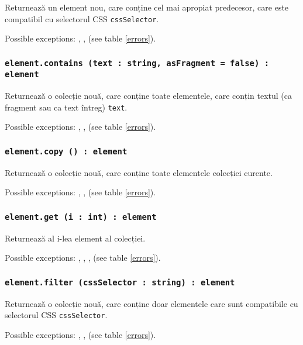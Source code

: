 Returnează un element nou, care conține cel mai apropiat predecesor, care este compatibil cu selectorul CSS \texttt{cssSelector}.

Possible exceptions: , ,  (see table \ref{errors}).

\subsubsection{\texttt{element.contains (text : string, asFragment = false) : element}}

Returnează o colecție nouă, care conține toate elementele, care conțin textul (ca fragment sau ca text întreg) \texttt{text}.

Possible exceptions: , ,  (see table \ref{errors}).

\subsubsection{\texttt{element.copy () : element}}

Returnează o colecție nouă, care conține toate elementele colecției curente.

Possible exceptions: , ,  (see table \ref{errors}).

\subsubsection{\texttt{element.get (i : int) : element}}

Returnează al i-lea element al colecției.

Possible exceptions: , , ,  (see table \ref{errors}).

\subsubsection{\texttt{element.filter (cssSelector : string) : element}}

Returnează o colecție nouă, care conține doar elementele care sunt compatibile cu selectorul CSS \texttt{cssSelector}.

Possible exceptions: , ,  (see table \ref{errors}).
